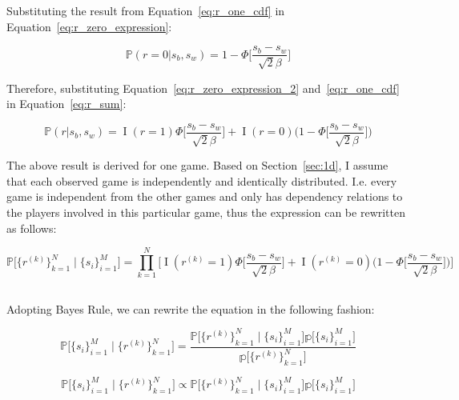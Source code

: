 \documentclass[a4paper,11pt]{article}
\theoremstyle{mytheor}
\begin{document}
Substituting the result from Equation~\ref{eq:r_one_cdf} in Equation~\ref{eq:r_zero_expression}:

\begin{equation}
    \label{eq:r_zero_expression_2}
    \mathbb{P}(r=0|s_b,s_w) = 1 - \Phi\Big[ \frac{s_b-s_w}{\sqrt{2}\beta} \Big]
\end{equation}

Therefore, substituting Equation~\ref{eq:r_zero_expression_2} and~\ref{eq:r_one_cdf} in Equation~\ref{eq:r_sum}:

\begin{equation}
    \label{eq:r_sum_2}
    \mathbb{P}(r|s_b,s_w) = \mathop{I}(r=1)\Phi\Big[ \frac{s_b-s_w}{\sqrt{2}\beta} \Big] + \mathop{I}(r=0)\Big( 1-\Phi\Big[ \frac{s_b-s_w}{\sqrt{2}\beta} \Big] \Big)
\end{equation}

The above result is derived for one game. Based on Section~\ref{sec:1d}, I assume that each observed game is independently and identically distributed. I.e. every game is independent from the other games and only has dependency relations to the players involved in this particular game, thus the expression can be rewritten as follows:

\begin{equation}
    \label{eq:r_iid}
    \mathbb{P} \Big[ \{r^{(k)}\}_{k=1}^{N}  \mid \{s_i\}_{i=1}^{M} \Big] = \prod_{k=1}^{N}\Big[
    \mathop{I}(r^{(k)}=1)\Phi\Big[ \frac{s_b-s_w}{\sqrt{2}\beta} \Big] + 
    \mathop{I}(r^{(k)}=0)\Big( 1-\Phi\Big[ \frac{s_b-s_w}{\sqrt{2}\beta} \Big] \Big)
    \Big]
\end{equation}

\subsection{}
\label{sec:2f}

Adopting Bayes Rule, we can rewrite the equation in the following fashion:

\begin{equation}
    \label{eq:2_f_bayes}
    \mathbb{P} \Big[ \{s_i\}_{i=1}^{M} \mid \{r^{(k)}\}_{k=1}^{N} \Big] = 
    \frac{\mathbb{P} \Big[ \{r^{(k)}\}_{k=1}^{N}  \mid \{s_i\}_{i=1}^{M} \Big]\mathbb{p} \Big[ \{s_i\}_{i=1}^{M} \Big]}
    {\mathbb{p} \Big[ \{r^{(k)}\}_{k=1}^{N} \Big]}
\end{equation}

\begin{equation}
    \label{eq:2_f_bayes_2}
    \mathbb{P} \Big[ \{s_i\}_{i=1}^{M} \mid \{r^{(k)}\}_{k=1}^{N} \Big] \propto \mathbb{P} \Big[ \{r^{(k)}\}_{k=1}^{N}  \mid \{s_i\}_{i=1}^{M} \Big]\mathbb{p} \Big[ \{s_i\}_{i=1}^{M} \Big]
\end{equation}
\end{document}

